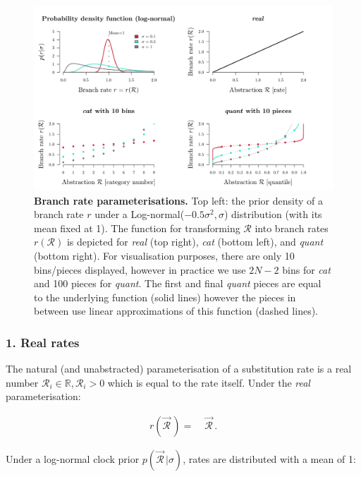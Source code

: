 \documentclass[10pt,letterpaper]{article}
\begin{document}
\begin{figure}[!h]
\includegraphics[width=\textwidth]{Figures/rateparameterisation.pdf}
\caption{\textbf{Branch rate parameterisations.} Top left: the prior density of a branch rate $r$ under a Log-normal($-0.5\sigma^2, \sigma$) distribution (with its mean fixed at 1). 
The function for transforming $\mathcal{R}$ into branch rates $r(\mathcal{R})$ is depicted for \textit{real} (top right), \textit{cat} (bottom left), and \textit{quant} (bottom right).
For visualisation purposes, there are only 10 bins/pieces displayed, however in practice we use $2N-2$ bins for \textit{cat} and 100 pieces for \textit{quant}.
The first and final \textit{quant} pieces are equal to the underlying function (solid lines) however the pieces in between use linear approximations of this function (dashed lines).}
\label{fig:rateparams}
\end{figure}



\clearpage
\subsubsection*{1. Real rates}
The natural (and unabstracted) parameterisation of a substitution rate is a real number $\mathcal{R}_i \in \mathbb{R}, \mathcal{R}_i > 0$ which is equal to the rate itself. 
Under the \textit{real} parameterisation:

\begin{align}
r(\vec{\mathcal{R}}^{\,}) =& \; \vec{\mathcal{R}}^{\,}.
\end{align}


Under a log-normal clock prior $p(\vec{\mathcal{R}}^{\,} | \sigma)$, rates are distributed with a mean of 1:
\end{document}
